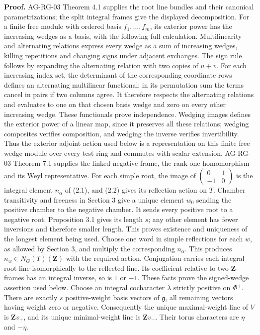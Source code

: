 \documentclass[11pt,a4paper,openany]{report}
\begin{document}
\textbf{Proof.} AG-RG-03 Theorem 4.1 supplies the root line bundles and their canonical parametrizations; the split integral frames give the displayed decomposition. For a finite free module with ordered basis \(f_1,\ldots,f_m\), its exterior power has the increasing wedges as a basis, with the following full calculation. Multilinearity and alternating relations express every wedge as a sum of increasing wedges, killing repetitions and changing signs under adjacent exchanges. The sign rule follows by expanding the alternating relation with two copies of \(u+v\). For each increasing index set, the determinant of the corresponding coordinate rows defines an alternating multilinear functional: in its permutation sum the terms cancel in pairs if two columns agree. It therefore respects the alternating relations and evaluates to one on that chosen basis wedge and zero on every other increasing wedge. These functionals prove independence. Wedging images defines the exterior power of a linear map, since it preserves all these relations; wedging composites verifies composition, and wedging the inverse verifies invertibility. Thus the exterior adjoint action used below is a representation on this finite free wedge module over every test ring and commutes with scalar extension. AG-RG-03 Theorem 7.1 supplies the linked negative frame, the rank-one homomorphism and its Weyl representative. For each simple root, the image of \(\left(\begin{smallmatrix}0&1\\-1&0\end{smallmatrix}\right)\) is the integral element \(n_\alpha\) of (2.1), and (2.2) gives its reflection action on \(T\). Chamber transitivity and freeness in Section 3 give a unique element \(w_0\) sending the positive chamber to the negative chamber. It sends every positive root to a negative root. Proposition 3.1 gives its length \(s\); any other element has fewer inversions and therefore smaller length. This proves existence and uniqueness of the longest element being used. Choose one word in simple reflections for each \(w\), as allowed by Section 3, and multiply the corresponding \(n_\alpha\). This produces \(n_w\in N_G(T)(\mathbf Z)\) with the required action. Conjugation carries each integral root line isomorphically to the reflected line. Its coefficient relative to two \(\mathbf Z\)-frames has an integral inverse, so is \(1\) or \(-1\). These facts prove the signed-wedge assertion used below. Choose an integral cocharacter \(\lambda\) strictly positive on \(\Phi^+\). There are exactly \(s\) positive-weight basis vectors of \(\mathfrak g\), all remaining vectors having weight zero or negative. Consequently the unique maximal-weight line of \(V\) is \(\mathbf Zv_+\), and its unique minimal-weight line is \(\mathbf Zv_-\). Their torus characters are \(\eta\) and \(-\eta\).
\end{document}
